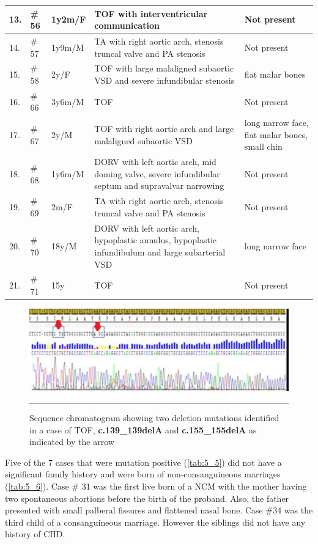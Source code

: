 \begin{refsection}
\begin{landscape}
\begin{spacing}{1}
\begin{longtable}{p{0.5in} p{0.5in} p{1in} p{3in} p{3in}}
	13.  & \# 56 & 1y2m/F & TOF with interventricular communication & Not present \\ \midrule
	14.  & \# 57 & 1y9m/M & TA with right aortic arch, stenosis truncal valve and PA stenosis & Not present \\ \midrule
	15.  & \# 58 & 2y/F & TOF with large malaligned subaortic VSD and severe infundibular stenosis & flat malar bones \\ \midrule
	16.  & \# 66 & 3y6m/M & TOF & Not present \\ \midrule
	17.  & \# 67 & 2y/M & TOF with right aortic arch and large malaligned subaortic VSD   & long narrow face, flat malar bones, small chin \\ \midrule
	18.  & \# 68 & 1y6m/M & DORV with left aortic arch, mid doming valve, severe infundibular septum and supravalvar narrowing & Not present \\ \midrule
	19.  & \# 69 & 2m/F & TA with right aortic arch, stenosis truncal valve and PA stenosis & Not present \\ \midrule
	20.  & \# 70 & 18y/M & DORV with left aortic arch, hypoplastic annulus, hypoplastic infundibulum and large subarterial VSD  & long narrow face \\ \midrule
	21.  & \# 71 & 15y & TOF & Not present \\ \bottomrule
\end{longtable}
\end{spacing}
\end{landscape}

\begin{figure}[!htb]
\centering
\includegraphics[scale=0.75,keepaspectratio]{Figures/Figure5_4.pdf}
\rule{35em}{0.5pt}
\caption{Sequence chromatogram showing two deletion mutations identified in a case of TOF, \textbf{c.139\_139delA} and \textbf{c.155\_155delA} as indicated by the arrow}
\label{fig:5_4}
\end{figure}

Five of the 7 cases that were mutation positive (\cref{tab:5_5}) did not have a significant family history and were born of non-consanguineous marriages (\cref{tab:5_6}). Case \# 31 was the first live born of a NCM with the mother having two spontaneous abortions before the birth of the proband. Also, the father presented with small palberal fissures and flattened nasal bone. Case \#34 was the third child of a consanguineous marriage. However the siblings did not have any history of CHD.



\end{refsection}
